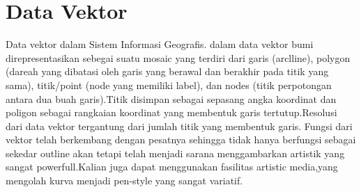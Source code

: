 


\section{Data Vektor}
Data vektor dalam Sistem Informasi Geografis. dalam  data vektor bumi direpresentasikan sebegai suatu  mosaic yang terdiri dari garis (arclline), polygon (dareah yang dibatasi oleh garis yang berawal dan berakhir pada titik yang sama), titik/point (node yang memiliki label),  dan nodes (titik perpotongan antara dua buah garis).Titik disimpan sebagai sepasang angka koordinat dan poligon sebagai rangkaian koordinat yang membentuk garis tertutup.Resolusi dari data vektor tergantung dari jumlah titik yang membentuk garis.
Fungsi dari vektor telah berkembang dengan pesatnya sehingga tidak hanya berfungsi sebagai sekedar outline akan tetapi telah menjadi sarana menggambarkan artistik yang sangat powerfull.Kalian juga dapat menggunakan fasilitas artistic media,yang mengolah kurva menjadi pen-style yang sangat variatif. 
